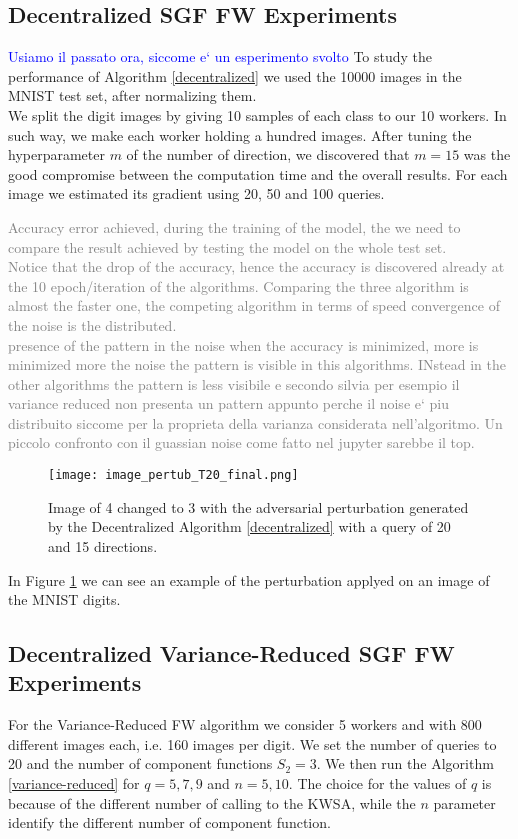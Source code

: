 \subsection{Decentralized SGF FW Experiments}
\textcolor{blue}{Usiamo il passato ora, siccome e` un esperimento svolto}
To study the performance of Algorithm \ref{decentralized} we used the 10000 images in the MNIST test set, after normalizing them.\\ We split the digit images by giving 10 samples of each class to our 10 workers. In such way, we make each worker holding a hundred images. After tuning the hyperparameter $m$ of the number of direction, we discovered that $m=15$ was the good compromise between the computation time and the overall results. For each image we estimated its gradient using 20, 50 and 100 queries.

\textcolor{gray}{Accuracy error achieved, during the training of the model, the we need to compare the result achieved by testing the model on the whole test set.\\ Notice that the drop of the accuracy, hence the accuracy is discovered already at the 10 epoch/iteration of the algorithms. Comparing the three algorithm is almost the faster one, the competing algorithm in terms of speed convergence of the noise is the distributed.
\\ presence of the pattern in the noise when the accuracy is minimized, more is minimized more the noise the pattern is visible in this algorithms. INstead in the other algorithms the pattern is less visibile e secondo silvia per esempio il variance reduced non presenta un pattern appunto perche il noise e` piu distribuito siccome per la proprieta della varianza considerata nell'algoritmo.
Un piccolo confronto con il guassian noise come fatto nel jupyter sarebbe il top.
}
\begin{figure}[htbp]
	\centering
	\texttt{[image: image\_pertub\_T20\_final.png]}
	\caption{Image of 4 changed to 3 with the adversarial perturbation generated by the Decentralized Algorithm \ref{decentralized} with a query of 20 and 15 directions.}
	\label{fig:decentralized}
\end{figure}
In Figure \ref{fig:decentralized} we can see an example of the perturbation applyed on an image of the MNIST digits.

\subsection{Decentralized Variance-Reduced SGF FW Experiments}
For the Variance-Reduced FW algorithm we consider 5 workers and with 800 different images each, i.e. 160 images per digit. We set the number of queries to 20 and the number of component functions $S_2 = 3$. We then run the Algorithm \ref{variance-reduced} for $q=5,7,9$ and $n=5,10$. The choice for the values of $q$ is because of the different number of calling to the KWSA, while the $n$ parameter identify the different number of component function.\\

